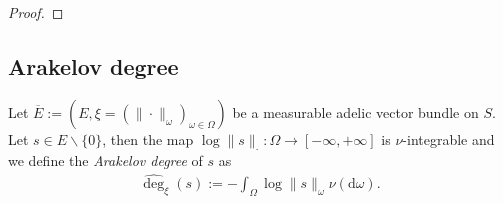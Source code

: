 \documentclass [11pt,reqno]{amsart}
\newcommand{\1}{\mathmybb{1}}
\def\diff{\mathrm{d}}
\def\um{\operatorname{um}}
\def\setminus{\smallsetminus}
\begin{document}
\begin{proof}

\end{proof}

\subsection{Arakelov degree}

\begin{definition}
\label{def:arakelov_degree_section}
Let $\overline{E}:= (E,\xi=(\|\cdot\|_{\omega})_{\omega\in\Omega})$ be a measurable adelic vector bundle on $S$. Let $s\in E\setminus\{0\}$, then the map $\log\|s\|_{\cdot} : \Omega \to [-\infty,+\infty]$ is $\nu$-integrable and we define the \emph{Arakelov degree} of $s$ as
\begin{align*}
\widehat{\deg}_{\xi}(s) := -\int_{\Omega} \log\|s\|_{\omega}\nu(\diff\omega).
\end{align*}
\end{definition}
\end{document}
